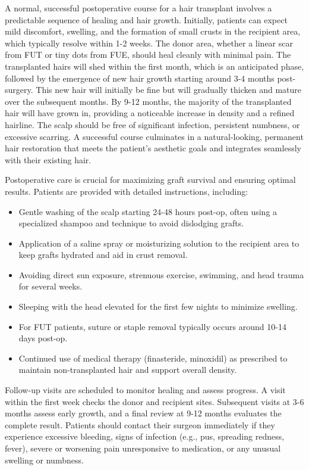 A normal, successful postoperative course for a hair transplant involves a predictable sequence of healing and hair growth. Initially, patients can expect mild discomfort, swelling, and the formation of small crusts in the recipient area, which typically resolve within 1-2 weeks. The donor area, whether a linear scar from FUT or tiny dots from FUE, should heal cleanly with minimal pain. The transplanted hairs will shed within the first month, which is an anticipated phase, followed by the emergence of new hair growth starting around 3-4 months post-surgery. This new hair will initially be fine but will gradually thicken and mature over the subsequent months. By 9-12 months, the majority of the transplanted hair will have grown in, providing a noticeable increase in density and a refined hairline. The scalp should be free of significant infection, persistent numbness, or excessive scarring. A successful course culminates in a natural-looking, permanent hair restoration that meets the patient's aesthetic goals and integrates seamlessly with their existing hair.

Postoperative care is crucial for maximizing graft survival and ensuring optimal results. Patients are provided with detailed instructions, including:
\begin{itemize}
  \item Gentle washing of the scalp starting 24-48 hours post-op, often using a specialized shampoo and technique to avoid dislodging grafts.
  \item Application of a saline spray or moisturizing solution to the recipient area to keep grafts hydrated and aid in crust removal.
  \item Avoiding direct sun exposure, strenuous exercise, swimming, and head trauma for several weeks.
  \item Sleeping with the head elevated for the first few nights to minimize swelling.
  \item For FUT patients, suture or staple removal typically occurs around 10-14 days post-op.
  \item Continued use of medical therapy (finasteride, minoxidil) as prescribed to maintain non-transplanted hair and support overall density.
\end{itemize}

Follow-up visits are scheduled to monitor healing and assess progress. A visit within the first week checks the donor and recipient sites. Subsequent visits at 3-6 months assess early growth, and a final review at 9-12 months evaluates the complete result. Patients should contact their surgeon immediately if they experience excessive bleeding, signs of infection (e.g., pus, spreading redness, fever), severe or worsening pain unresponsive to medication, or any unusual swelling or numbness.

